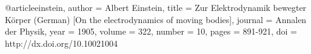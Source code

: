 @article{einstein,
author = {Albert Einstein},
title
= {Zur Elektrodynamik bewegter K{\"o}rper
(German) [On the electrodynamics of moving bodies]},
journal = {Annalen der Physik},
year = {1905},
volume = {322},
number = {10},
pages = {891-921},
doi =
    {http://dx.doi.org/10.10021004}
}